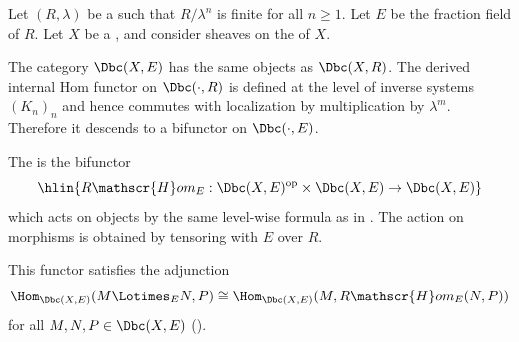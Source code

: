 \begin{definition} \label{definition:derived_internal_hom_on_bdd_constructible_complexes_with_rational_coefficients_on_a_noetherian_scheme}
    Let $(R, \lambda)$ be a   such that $R/\lambda^n$ is finite for all $n \geq 1$. Let $E$ be the fraction field of $R$. Let $X$ be a , and consider sheaves on the  of $X$.

    The category $\Dbc(X, E)$ has the same objects as $\Dbc(X, R)$. The derived internal Hom functor on $\Dbc(\cdot, R)$ is defined at the level of inverse systems $(K_n)_n$ and hence commutes with localization by multiplication by $\lambda^m$. Therefore it descends to a bifunctor on $\Dbc(\cdot, E)$.

    The  is the bifunctor
    $$\hlin{R\mathscr{H}om_E : \Dbc(X, E)^{\mathrm{op}} \times \Dbc(X, E) \to \Dbc(X, E)}$$
    which acts on objects by the same level-wise formula as in . The action on morphisms is obtained by tensoring with $E$ over $R$.

    This functor satisfies the adjunction
    $$\Hom_{\Dbc(X,E)}(M \Lotimes_E N, P) \cong \Hom_{\Dbc(X,E)}(M, R\mathscr{H}om_E(N,P))$$
    for all $M,N,P \in \Dbc(X, E)$ ().
\end{definition}
